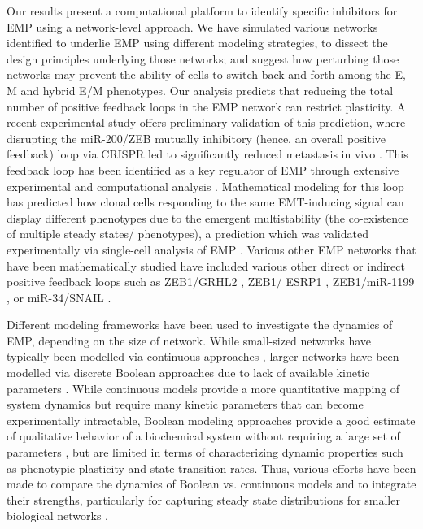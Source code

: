 \documentclass[preprint,review,12pt]{elsarticle}
\begin{document}
	Our results present a computational platform to identify specific inhibitors for EMP using a network-level approach. We have simulated various networks identified to underlie EMP using different modeling strategies, to dissect the design principles underlying those networks; and suggest how perturbing those networks may prevent the ability of cells to switch back and forth among the E, M and hybrid E/M phenotypes. Our analysis predicts that reducing the total number of positive feedback loops in the EMP network can restrict plasticity. A recent experimental study offers preliminary validation of this prediction, where disrupting the miR-200/ZEB mutually inhibitory (hence, an overall positive feedback) loop via CRISPR led to significantly reduced metastasis in vivo \cite{Celia-Terrassa2018}. This feedback loop has been identified as a key regulator of EMP through extensive experimental and computational analysis \cite{Brabletz2010, Lu2013, Tian2013}. Mathematical modeling for this loop has predicted how clonal cells responding to the same EMT-inducing signal can display different phenotypes due to the emergent multistability (the co-existence of multiple steady states/ phenotypes), a prediction which was validated experimentally via single-cell analysis of EMP \cite{Celia-Terrassa2018}. Various other EMP networks that have been mathematically studied have included various other direct or indirect positive feedback loops such as ZEB1/GRHL2 \cite{Mooney2017}, ZEB1/ ESRP1 \cite{Jolly2018a}, ZEB1/miR-1199 \cite{Silveira2019}, or miR-34/SNAIL \cite{Jia2017}. 
	
	Different modeling frameworks have been used to investigate the dynamics of EMP, depending on the size of network. While small-sized networks have typically been modelled via continuous approaches \cite{Bocci2018, Hong2015, Jolly2015, Lu2013, Huang2015, Kang2019}, larger networks have been modelled via  discrete Boolean approaches due to lack of available kinetic parameters \cite{Font-Clos2018, Silveira2019, Steinway2014,  Steinway2015}. While continuous models provide a more quantitative mapping of system dynamics but require many kinetic parameters that can become experimentally intractable, Boolean modeling approaches provide a good estimate of qualitative behavior of a biochemical system without requiring a large set of parameters \cite{Wynn2012}, but are limited in terms of  characterizing dynamic properties such as phenotypic plasticity and state transition rates. Thus, various efforts have been made to compare the dynamics of Boolean vs. continuous models and to integrate their strengths, particularly for capturing steady state distributions for smaller biological networks \cite{Saadatpour2016, Samaga2013, Wittmann2009}. 
	
\end{document}
